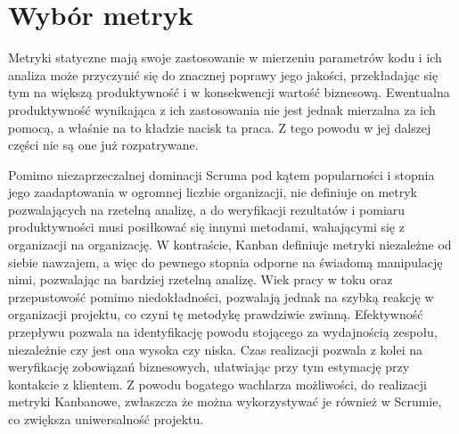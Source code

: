 \section{Wybór metryk}
Metryki statyczne mają swoje zastosowanie w mierzeniu parametrów kodu i ich analiza może przyczynić się do znacznej poprawy jego jakości, przekładając się tym
na większą produktywność i w konsekwencji wartość biznesową. Ewentualna produktywność wynikająca z ich zastosowania nie jest jednak mierzalna za ich pomocą, a właśnie
na to kładzie nacisk ta praca. Z tego powodu w jej dalszej części nie są one już rozpatrywane.

Pomimo niezaprzeczalnej dominacji Scruma pod kątem popularności i stopnia jego zaadaptowania w ogromnej liczbie organizacji, nie definiuje on metryk pozwalających
na rzetelną analizę, a do weryfikacji rezultatów i pomiaru produktywności musi posiłkować się innymi metodami, wahającymi się z organizacji na organizację.
W kontraście, Kanban definiuje metryki niezależne od siebie nawzajem, a więc do pewnego stopnia odporne na świadomą manipulację nimi, pozwalając na bardziej rzetelną analizę.
Wiek pracy w toku oraz przepustowość pomimo niedokładności, pozwalają jednak na szybką reakcję w organizacji projektu, co czyni tę metodykę prawdziwie zwinną.
Efektywność przepływu pozwala na identyfikację powodu stojącego za wydajnością zespołu, niezależnie czy jest ona wysoka czy niska.
Czas realizacji pozwala z kolei na weryfikację zobowiązań biznesowych, ułatwiając przy tym estymację przy kontakcie z klientem.
Z powodu bogatego wachlarza możliwości, do realizacji metryki Kanbanowe, zwłaszcza że można wykorzystywać je również w Scrumie, co zwiększa uniwersalność projektu.
